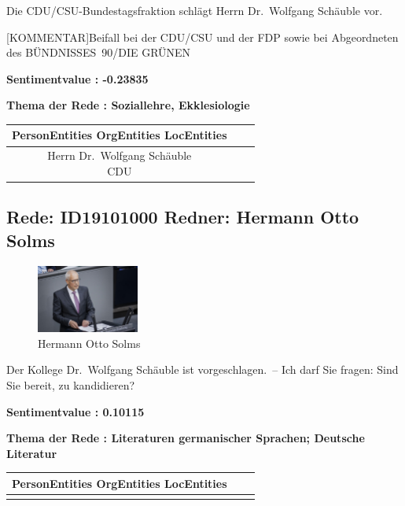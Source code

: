 \documentclass[a4paper,11pt]{article}
\begin{document}
Die CDU/CSU-Bundestagsfraktion schlägt Herrn Dr. Wolfgang Schäuble vor.

[KOMMENTAR]Beifall bei der CDU/CSU und der FDP sowie bei Abgeordneten des BÜNDNISSES 90/DIE GRÜNEN


\textbf{Sentimentvalue : -0.23835}

\textbf{Thema der Rede : Soziallehre, Ekklesiologie}
\vspace*{1cm}

\begin{table}[ht]
\centering
\begin{tabular}{||c | c | c||}
\hline
PersonEntities  OrgEntities  LocEntities \\ 

\hline\hline
\makecell{Herrn Dr. Wolfgang Schäuble \\
} 
\makecell{CDU \\
} 
\makecell{}\\
\hline
\end{tabular}
\end{table}
\clearpage


\subsection{Rede: ID19101000  Redner: Hermann Otto Solms}

\begin{figure}[ht]

\centering

\includegraphics[width=0.3\textwidth]{Hermann_Otto_Solms.jpg}

\caption{Hermann Otto Solms}

\end{figure}

Der Kollege Dr. Wolfgang Schäuble ist vorgeschlagen. – Ich darf Sie fragen: Sind Sie bereit, zu kandidieren?

\textbf{Sentimentvalue : 0.10115}

\textbf{Thema der Rede : Literaturen germanischer Sprachen; Deutsche Literatur}
\vspace*{1cm}

\begin{table}[ht]
\centering
\begin{tabular}{||c | c | c||}
\hline
PersonEntities  OrgEntities  LocEntities \\ 

\hline\hline
\makecell{} 
\makecell{} 
\makecell{}\\
\hline
\end{tabular}
\end{table}
\clearpage
\end{document}
